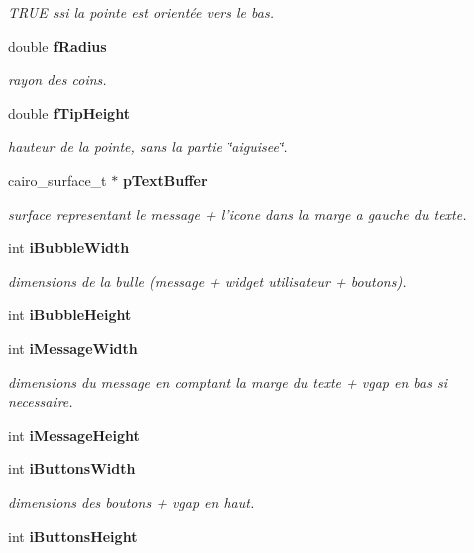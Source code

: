 \begin{CompactItemize}
\begin{CompactList}\small\item\em TRUE ssi la pointe est orientée vers le bas. \item\end{CompactList}\item 
double {\bf fRadius}
\begin{CompactList}\small\item\em rayon des coins. \item\end{CompactList}\item 
double {\bf fTipHeight}
\begin{CompactList}\small\item\em hauteur de la pointe, sans la partie \char`\"{}aiguisee\char`\"{}. \item\end{CompactList}\item 
cairo\_\-surface\_\-t $\ast$ {\bf pTextBuffer}
\begin{CompactList}\small\item\em surface representant le message + l'icone dans la marge a gauche du texte. \item\end{CompactList}\item 
int {\bf iBubbleWidth}
\begin{CompactList}\small\item\em dimensions de la bulle (message + widget utilisateur + boutons). \item\end{CompactList}\item 
int {\bf iBubbleHeight}
\item 
int {\bf iMessageWidth}
\begin{CompactList}\small\item\em dimensions du message en comptant la marge du texte + vgap en bas si necessaire. \item\end{CompactList}\item 
int {\bf iMessageHeight}
\item 
int {\bf iButtonsWidth}
\begin{CompactList}\small\item\em dimensions des boutons + vgap en haut. \item\end{CompactList}\item 
int {\bf iButtonsHeight}
\item 

\end{CompactItemize}
